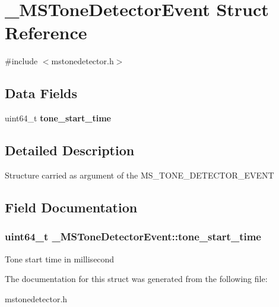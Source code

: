 \section{\_\-MSToneDetectorEvent Struct Reference}
\label{struct__MSToneDetectorEvent}


{\ttfamily \#include $<$mstonedetector.h$>$}\subsection*{Data Fields}
\begin{DoxyCompactItemize}
\item 
uint64\_\-t {\bf tone\_\-start\_\-time}
\end{DoxyCompactItemize}


\subsection{Detailed Description}
Structure carried as argument of the MS\_\-TONE\_\-DETECTOR\_\-EVENT 

\subsection{Field Documentation}
\subsubsection[{tone\_\-start\_\-time}]{\setlength{\rightskip}{0pt plus 5cm}uint64\_\-t {\bf \_\-MSToneDetectorEvent::tone\_\-start\_\-time}}\label{struct__MSToneDetectorEvent_a535cb13b07856d22a925a5f87c87b4e4}
Tone start time in millisecond 

The documentation for this struct was generated from the following file:\begin{DoxyCompactItemize}
\item 
mstonedetector.h\end{DoxyCompactItemize}

